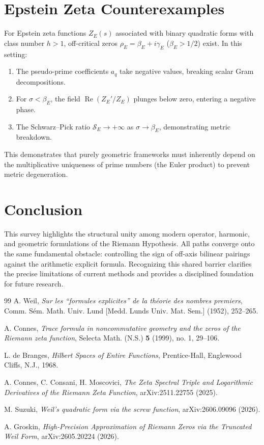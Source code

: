 \documentclass[12pt, a4paper]{article}
\begin{document}
\section{Epstein Zeta Counterexamples}
For Epstein zeta functions $Z_E(s)$ associated with binary quadratic forms with class number $h > 1$, off-critical zeros $\rho_E = \beta_E + i\gamma_E$ ($\beta_E > 1/2$) exist. In this setting:
\begin{enumerate}
    \item The pseudo-prime coefficients $a_q$ take negative values, breaking scalar Gram decompositions.
    \item For $\sigma < \beta_E$, the field $\operatorname{Re}(Z_E'/Z_E)$ plunges below zero, entering a negative phase.
    \item The Schwarz--Pick ratio $\mathcal{S}_E \to +\infty$ as $\sigma \to \beta_E$, demonstrating metric breakdown.
\end{enumerate}
This demonstrates that purely geometric frameworks must inherently depend on the multiplicative uniqueness of prime numbers (the Euler product) to prevent metric degeneration.

\section{Conclusion}
This survey highlights the structural unity among modern operator, harmonic, and geometric formulations of the Riemann Hypothesis. All paths converge onto the same fundamental obstacle: controlling the sign of off-axis bilinear pairings against the arithmetic explicit formula. Recognizing this shared barrier clarifies the precise limitations of current methods and provides a disciplined foundation for future research.

\begin{thebibliography}{99}
A. Weil, \emph{Sur les ``formules explicites'' de la th\'eorie des nombres premiers}, Comm. S\'em. Math. Univ. Lund [Medd. Lunds Univ. Mat. Sem.] (1952), 252--265.

A. Connes, \emph{Trace formula in noncommutative geometry and the zeros of the Riemann zeta function}, Selecta Math. (N.S.) \textbf{5} (1999), no. 1, 29--106.

L. de Branges, \emph{Hilbert Spaces of Entire Functions}, Prentice-Hall, Englewood Cliffs, N.J., 1968.

A. Connes, C. Consani, H. Moscovici, \emph{The Zeta Spectral Triple and Logarithmic Derivatives of the Riemann Zeta Function}, arXiv:2511.22755 (2025).

M. Suzuki, \emph{Weil's quadratic form via the screw function}, arXiv:2606.09096 (2026).

A. Groskin, \emph{High-Precision Approximation of Riemann Zeros via the Truncated Weil Form}, arXiv:2605.20224 (2026).
\end{thebibliography}
\end{document}
